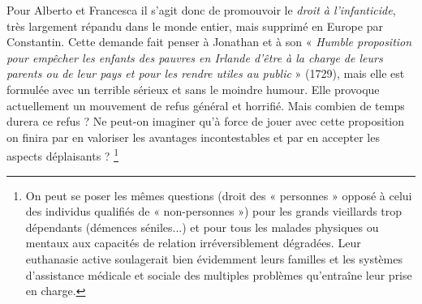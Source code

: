  Pour Alberto  et Francesca   il  s'agit donc de promouvoir le \emph{droit à l'infanticide}, très largement répandu dans le monde entier, mais supprimé en Europe par Constantin. Cette demande fait penser à Jonathan  et à son « \emph{Humble proposition pour empêcher les enfants des pauvres en Irlande d'être à la charge de leurs parents ou de leur pays et pour les rendre utiles au public} » (1729), mais elle est formulée avec un terrible sérieux et sans le moindre humour. Elle provoque actuellement un mouvement de refus général et horrifié. Mais combien de temps durera ce refus ? Ne peut-on imaginer qu'à force de jouer avec cette proposition on finira par en valoriser les avantages incontestables et par en accepter les aspects déplaisants ? 
 \footnote{On peut se poser les mêmes questions (droit des « personnes » opposé à celui des individus qualifiés de « non-personnes ») pour les grands vieillards trop dépendants (démences séniles...) et pour tous les malades physiques ou mentaux aux capacités de relation irréversiblement dégradées. Leur euthanasie active soulagerait bien évidemment leurs familles et les systèmes d'assistance médicale et sociale des multiples problèmes qu'entraîne leur prise en charge.}%
 
 
 

 
